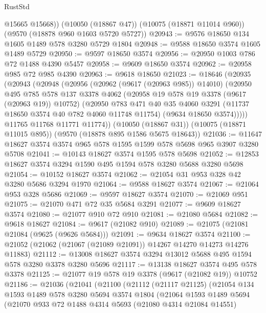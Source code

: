 \begin{lexlean}{RustStd}
\begin{coremodule}
{\begin{coremodule}
{{{{{{{{{{{{{{{{{{{{{{{{{{{{{{{{{        @15665
        @15668))
    (@10050 (@18867 @47))
    (@10075 (@18871 @11014 @960))
    (@9570 (@18878 @960 @1603 @5720 @5727))
@20943 := @9576 @18650 @134 @1605 @1489 @578 @3280 @5729 @1804
@20948 := @9588 @18650 @3574 @1605 @1489 @5729
@20950 := @9597 @18650 @3574
@20956 := @20950 @1003 @786 @72 @1488 @4390 @5457
@20958 := @9609 @18650 @3574
@20962 := @20958 @985 @72 @985 @4390
@20963 := @9618 @18650
@21023 := @18646
    (@20935
      (@20943
        (@20948
          (@20956
            (@20962 (@9617 (@20963 @985)) @14010)
            (@20950
              @495
              @785
              @578
              @137
              @3378
              @4062
              (@20958 @19 @578 @19 @3378 (@9617 (@20963 @19)) @10752)
              (@20950
                @783
                @471
                @40
                @35
                @4060
                @3291
                (@11737 @18650 @3574 @40 @782 @4060 @11748 @11754)
                (@9634 @18650 @3574)))))
        @11765
        @11768
        @11771
        @11774))
    (@10050 (@18867 @31))
    (@10075 (@18871 @11015 @895))
    (@9570 (@18878 @895 @1586 @5675 @18643))
@21036 := @11647 @18627 @3574 @3574 @965 @578 @1595 @1599 @578 @5698 @965 @3907 @3280 @5708
@21041 := @10143 @18627 @3574 @1595 @578 @5698
@21052 := @12853 @18627 @3574 @3294 @1590 @495 @1594 @578 @3280 @5688 @3280 @5698
@21054 := @10152 @18627 @3574
@21062 := @21054 @31 @953 @328 @42 @3280 @5686 @3294 @1970
@21064 := @9588 @18627 @3574
@21067 := @21064 @953 @328 @5686
@21069 := @9597 @18627 @3574
@21070 := @21069 @951
@21075 := @21070 @471 @72 @35 @5684 @3291
@21077 := @9609 @18627 @3574
@21080 := @21077 @910 @72 @910
@21081 := @21080 @5684
@21082 := @9618 @18627
@21084 := @9617 (@21082 @910)
@21089 := @21075 (@21081 @21084 (@9625 (@9626 @5684)))
@21091 := @9634 @18627 @3574
@21100 := @21052 (@21062 (@21067 (@21089 @21091)) @14267 @14270 @14273 @14276 @11883)
@21112 := @13008 @18627 @3574 @3294 @13012 @5688 @495 @1594 @578 @3280 @3378 @3280 @5696
@21117 := @13138 @18627 @3574 @495 @578 @3378
@21125 := @21077 @19 @578 @19 @3378 (@9617 (@21082 @19)) @10752
@21186 := @21036
    (@21041
      (@21100
        (@21112
          (@21117 @21125)
          (@21054
            @134
            @1593
            @1489
            @578
            @3280
            @5694
            @3574
            @1804
            (@21064
              @1593
              @1489
              @5694
              (@21070
                @933
                @72
                @1488
                @4314
                @5693
                (@21080 @4314 @21084 @14551)
}}}}}}}}}}}}}}}}}}}}}}}}}}}}}}}}}
\end{coremodule}}
\end{coremodule}
\end{lexlean}
